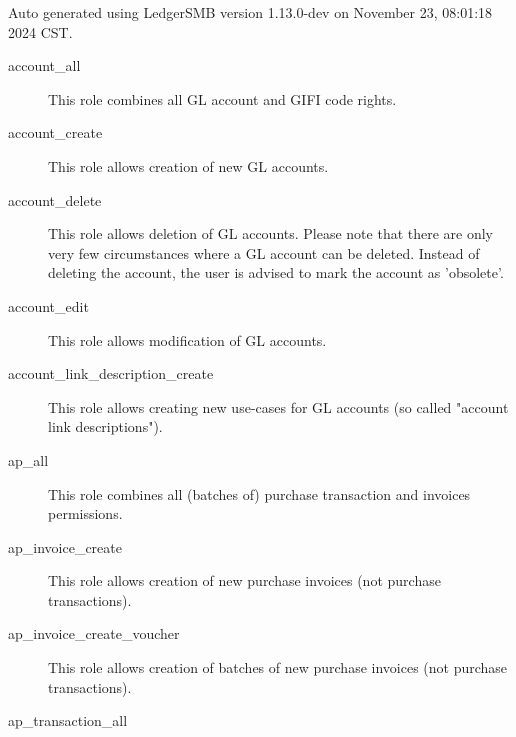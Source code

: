 
Auto generated using LedgerSMB version 1.13.0-dev on November 23, 08:01:18 2024 CST.

\begin{description}
\item [account\_all] \htmlspacing 
                         This role combines all \gls{GL}  account and GIFI code rights.
\item [account\_create] \htmlspacing 
                         This role allows creation of new \gls{GL}  accounts.
\item [account\_delete] \htmlspacing 
                         This role allows deletion of \gls{GL}  accounts.
                         Please note that there are only very few circumstances
                         where a \gls{GL}  account can be deleted.  Instead of deleting
                         the account, the user is advised to mark the account
                         as 'obsolete'.
\item [account\_edit] \htmlspacing 
                         This role allows modification of \gls{GL}  accounts.
\item [account\_link\_description\_create] \htmlspacing 
                         This role allows creating new use-cases for \gls{GL} 
                         accounts (so called "account link descriptions").
\item [ap\_all] \htmlspacing 
                         This role combines all (batches of) purchase transaction and invoices permissions.
\item [ap\_invoice\_create] \htmlspacing 
                         This role allows creation of new purchase invoices (not purchase transactions).
\item [ap\_invoice\_create\_voucher] \htmlspacing 
                         This role allows creation of batches of new purchase invoices (not purchase transactions).
\item [ap\_transaction\_all] \htmlspacing 

\end{description}
